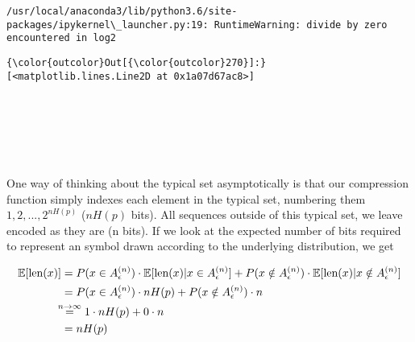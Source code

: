 \documentclass[11pt]{article}
\begin{document}
    \begin{Verbatim}[commandchars=\\\{\}]
/usr/local/anaconda3/lib/python3.6/site-packages/ipykernel\_launcher.py:19: RuntimeWarning: divide by zero encountered in log2

    \end{Verbatim}

\begin{Verbatim}[commandchars=\\\{\}]
{\color{outcolor}Out[{\color{outcolor}270}]:} [<matplotlib.lines.Line2D at 0x1a07d67ac8>]
\end{Verbatim}
            
    \begin{center}
    \end{center}
    { \hspace*{\fill} \\}
    
    \begin{center}
    \end{center}
    { \hspace*{\fill} \\}
    
    \begin{center}
    \end{center}
    { \hspace*{\fill} \\}
    
    One way of thinking about the typical set asymptotically is that our
compression function simply indexes each element in the typical set,
numbering them \(1,2,...,2^{nH(p)}\) (\(nH(p)\) bits). All sequences
outside of this typical set, we leave encoded as they are (n bits). If
we look at the expected number of bits required to represent an symbol
drawn according to the underlying distribution, we get

\[\begin{align}
\mathbb{E} [\text{len}(x)] 
&= P(x \in A_\epsilon^{(n)}) \cdot \mathbb{E} [\text{len}(x) | x \in A_\epsilon^{(n)}] + P(x \notin A_\epsilon^{(n)}) \cdot \mathbb{E} [\text{len}(x) | x \notin A_\epsilon^{(n)}]\\
&= P(x \in A_\epsilon^{(n)}) \cdot nH(p) + P(x \notin A_\epsilon^{(n)}) \cdot n\\
& \hspace{-.2cm} \overset{n \rightarrow \infty}{=} 1 \cdot n H(p) + 0 \cdot n\\
&= nH(p)
\end{align}\]
\end{document}
